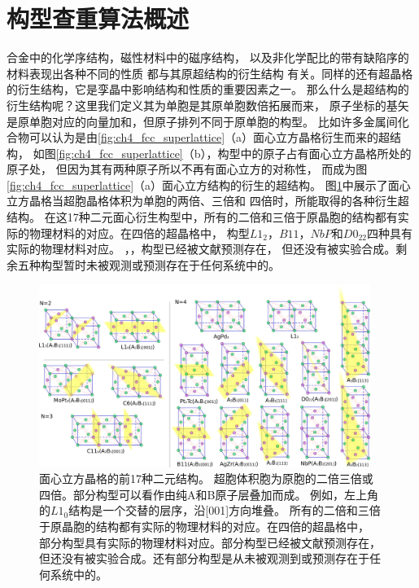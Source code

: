 \section{构型查重算法概述}
合金中的化学序结构，磁性材料中的磁序结构，
以及非化学配比的带有缺陷序的材料表现出各种不同的性质
都与其原超结构的衍生结构\cite{buerger1947derivative, santoro1973coincidence, santoro1972properties}
有关。同样的还有超晶格的衍生结构，它是孪晶中影响结构和性质的重要因素之一。
那么什么是超结构的衍生结构呢？这里我们定义其为单胞是其原单胞数倍拓展而来，
原子坐标的基矢是原单胞对应的向量加和，但原子排列不同于原单胞的构型。
比如许多金属间化合物可以认为是由\ref{fig:ch4_fcc_superlattice}（a）面心立方晶格衍生而来的超结构，
如图\ref{fig:ch4_fcc_superlattice}（b），构型中的原子占有面心立方晶格所处的原子处，
但因为其有两种原子所以不再有面心立方的对称性，
而成为图\ref{fig:ch4_fcc_superlattice}（a）面心立方结构的衍生的超结构。
图\ref{fig:ch4_fcc_234_ss}中展示了面心立方晶格当超胞晶格体积为单胞的两倍、三倍和
四倍时，所能取得的各种衍生超结构。
在这17种二元面心衍生构型中，所有的二倍和三倍于原晶胞的结构都有实际的物理材料的对应。在四倍的超晶格中，
构型$L1_2$，$B11$，$NbP$和$D0_{22}$四种具有实际的物理材料对应。
，，构型已经被文献\cite{curtarolo2005accuracy}预测存在，
但还没有被实验合成。剩余五种构型暂时未被观测或预测存在于任何系统中的。

\begin{figure}
  \includegraphics[width=0.96\textwidth]{figs/all17fcc.png}
  \centering
  \caption{面心立方晶格的前17种二元结构。
  超胞体积胞为原胞的二倍三倍或四倍。部分构型可以看作由纯A和B原子层叠加而成。
  例如，左上角的$L1_{0}$结构是一个交替的层序，沿[001]方向堆叠。
  所有的二倍和三倍于原晶胞的结构都有实际的物理材料的对应。在四倍的超晶格中，
  部分构型具有实际的物理材料对应。部分构型已经被文献\cite{curtarolo2005accuracy}预测存在，
  但还没有被实验合成。还有部分构型是从未被观测到或预测存在于任何系统中的。}
  \label{fig:ch4_fcc_234_ss}
\end{figure}


